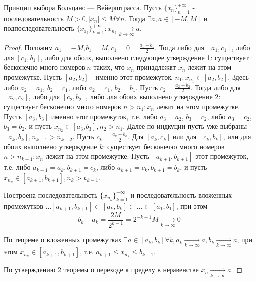 \documentclass[main]{subfiles}
\begin{document}
\begin{theorem}
    Принцип выбора Больцано — Вейерштрасса. Пусть $\{x_{n}\}_{n=1}^{+\infty}$
    - последовательность $M > 0, |x_n| \leq M \forall n$. Тогда 
    $\exists a, a \in [-M, M]$ и подпоследовательность 
    $\{x_{n_k}\}_{k=1}^{+\infty} : x_{n_k} \underset{k\to\infty}{\to} a$.
\end{theorem}
\begin{proof}
    Положим $a_1 = -M, b_1 = M, c_1 = 0 = \frac{a_1 + b_1}{2}$. Тогда либо для 
    $[a_1, c_1]$, либо для $[c_1, b_1]$, либо для обоих, выполнено следующее 
    утверждение 1: существует бесконечно много номеров $n$ таких, что 
    $x_n$ принадлежит $x_n$ лежит на этом промежутке. Пусть $[a_2, b_2]$ - 
    именно этот промежуток, $n_1 : x_{n_1} \in [a_2, b_2]$. Здесь либо
    $a_2 = a_1$, $b_2 = c_1$, либо $a_2 = c_1$, $b_2 = b_1$. Пусть 
    $c_2 = \frac{a_2 + b_2}{2}$. Тогда либо для $[a_2, c_2]$, либо для 
    $[c_2, b_2]$, либо для обоих выполнено утверждение 2: существует
    бесконечно много номеров $n > n_1 : x_n$ лежит на этом промежутке. 
    Пусть $[a_3, b_3]$ именно этот промежуток, т.е. либо $a_3 = a_2$, 
    $b_3 = c_2$, либо $a_3 = c_2$, $b_3 = b_2$, и пусть $x_{n_2} \in 
    [a_3, b_3], n_2 > n_1$. Далее по индкуции пусть уже выбраны 
    $[a_k, b_k], n_{k-1} > n_{k-2}$. Пусть $c_k = \frac{a_k + b_k}{2}$.
    Для $[a_k, c_k]$ или для $[c_k, b_k]$, или для обоих выполнено утверждение
    $k$: существует бесконечно много номеров $n > n_{k-1} : x_n$ лежит 
    на этом промежутке. Пусть $[a_{k+1}, b_{k+1}]$ этот промежуток, т.е. 
    либо $a_{k+1} = a_k, b_{k+1} = c_k$, либо $a_{k+1} = c_k, b_{k+1} = b_k$,
    и пусть $x_{n_k} \in [a_{k+1}, b_{k+1}], n_k > n_{k - 1}$. 

    Построена последовательность $\{x_{n_k}\}_{k=1}^{+\infty}$ и 
    последовательность вложенных промежутков $\ldots [a_{k+1}, b_{k+1}] 
    \subset [a_k, b_k] \subset \ldots \subset [a_1, b_1]$, при этом 
    \begin{equation*}
        b_k - a_k = \frac{2M}{2^{k-1}} = 2^{-k+1}M \underset{k\to\infty}{\to} 0
    \end{equation*}

    По теореме о вложенных промежутках $\exists a \in [a_k, b_k] \forall k,
    a_k \underset{k\to\infty}{\to} a, b_k \underset{k\to\infty}{\to} a$, 
    при этом $x_{n_k} \in [a_{k+1}, b_{k+1}]$, т.е. $a_{k+1} \leq x_{n_k} \leq 
    b_{k+1}$.

    По утверждению 2 теоремы о переходе к пределу в неравенстве $x_n 
    \underset{k\to\infty}{\to} a$.
\end{proof}
\end{document}
